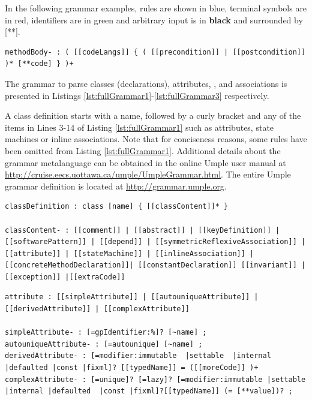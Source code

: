 In the following grammar examples, {\color{variableBlue}rules} are shown in blue, {\color{keywordRed}terminal} symbols are in red, {\color{stringGreen}identifiers} are in green and arbitrary input is in \textbf{black} and surrounded by [**]. 

\begin{lstlisting}[language={grammar}, label=lst:grammarExtra,caption=Grammar for Umple classes]
methodBody- : ( [[codeLangs]] { ( [[precondition]] | [[postcondition]] )* [**code] } )+
\end{lstlisting}

The grammar to parse classes (declarations), attributes, , and associations is presented in Listings \ref{lst:fullGrammar1}-\ref{lst:fullGrammar3} respectively.

A class definition starts with a name, followed by a curly bracket and any of the items in Lines 3-14 of Listing \ref{lst:fullGrammar1} such as attributes, state machines or inline associations. Note that for conciseness reasons, some rules have been omitted from Listing \ref{lst:fullGrammar1}. Additional details about the grammar metalanguage can be obtained in the online Umple user manual at \url{http://cruise.eecs.uottawa.ca/umple/UmpleGrammar.html}. The entire Umple grammar definition is located at \url{http://grammar.umple.org}.


\begin{lstlisting}[language={grammar}, label=lst:fullGrammar1,caption=Umple Grammar for classes]
classDefinition : class [name] { [[classContent]]* }

classContent- : [[comment]] | [[abstract]] | [[keyDefinition]] | [[softwarePattern]] | [[depend]] | [[symmetricReflexiveAssociation]] | [[attribute]] | [[stateMachine]] | [[inlineAssociation]] |[[concreteMethodDeclaration]]| [[constantDeclaration]] [[invariant]] | [[exception]] |[[extraCode]]
\end{lstlisting}

\begin{lstlisting}[language={grammar}, label=lst:fullGrammar2,caption=Umple Grammar for attributes]
attribute : [[simpleAttribute]] | [[autouniqueAttribute]] | [[derivedAttribute]] | [[complexAttribute]]

simpleAttribute- : [=gpIdentifier:%]? [~name] ;
autouniqueAttribute- : [=autounique] [~name] ;
derivedAttribute- : [=modifier:immutable  |settable  |internal |defaulted |const |fixml]? [[typedName]] = ([[moreCode]] )+
complexAttribute- : [=unique]? [=lazy]? [=modifier:immutable |settable |internal |defaulted  |const |fixml]?[[typedName]] (= [**value])? ;
\end{lstlisting}

